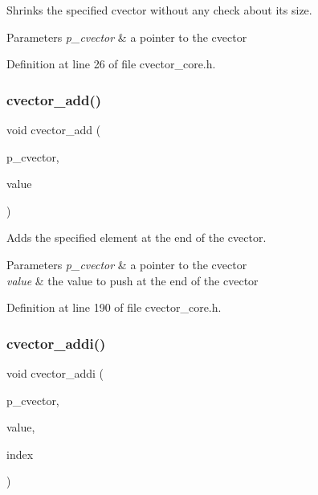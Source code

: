 Shrinks the specified cvector without any check about its size. 
\begin{DoxyParams}{Parameters}
{\em p\+\_\+cvector} & a pointer to the cvector \\
\hline
\end{DoxyParams}


Definition at line 26 of file cvector\+\_\+core.\+h.

\mbox{\label{cvector__interface_8h_ad504959e360214da1255d28534b1d3a4}} 
\subsubsection{cvector\+\_\+add()}
{\footnotesize\ttfamily void cvector\+\_\+add (\begin{DoxyParamCaption}\item[{\textbf{ cvector} $\ast$}]{p\+\_\+cvector,  }\item[{\textbf{ value\+\_\+t}}]{value }\end{DoxyParamCaption})}

Adds the specified element at the end of the cvector. 
\begin{DoxyParams}{Parameters}
{\em p\+\_\+cvector} & a pointer to the cvector \\
\hline
{\em value} & the value to push at the end of the cvector \\
\hline
\end{DoxyParams}


Definition at line 190 of file cvector\+\_\+core.\+h.

\mbox{\label{cvector__interface_8h_aded13abbf232cf0d65c889cb806cee0b}} 
\subsubsection{cvector\+\_\+addi()}
{\footnotesize\ttfamily void cvector\+\_\+addi (\begin{DoxyParamCaption}\item[{\textbf{ cvector} $\ast$}]{p\+\_\+cvector,  }\item[{\textbf{ value\+\_\+t}}]{value,  }\item[{\textbf{ index\+\_\+t}}]{index }\end{DoxyParamCaption})}

